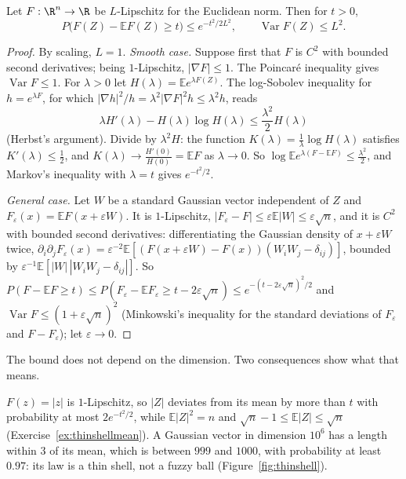 \begin{theorem}\label{thm:gaussconc}
Let $F:\R^n\to\R$ be $L$-Lipschitz for the Euclidean norm. Then for $t>0$,
\[
P\bigl(F(Z)-\mathbb EF(Z)\ge t\bigr)\le e^{-t^2/2L^2},\qquad\operatorname{Var}F(Z)\le L^2.
\]
\end{theorem}
\begin{proof}
By scaling, $L=1$. \emph{Smooth case.} Suppose first that $F$ is $C^2$ with bounded second derivatives; being $1$-Lipschitz, $|\nabla F|\le1$. The Poincar\'e inequality gives
$\operatorname{Var}F\le1$. For $\lambda>0$ let $H(\lambda)=\mathbb Ee^{\lambda F(Z)}$. The log-Sobolev inequality for $h=e^{\lambda F}$, for which $|\nabla h|^2/h=\lambda^2|\nabla F|^2h\le\lambda^2h$, reads
\[
\lambda H'(\lambda)-H(\lambda)\log H(\lambda)\le\frac{\lambda^2}2H(\lambda)
\]
(Herbst's argument). Divide by $\lambda^2H$: the function $K(\lambda)=\frac1\lambda\log H(\lambda)$ satisfies $K'(\lambda)\le\frac12$, and $K(\lambda)\to\frac{H'(0)}{H(0)}=\mathbb EF$ as $\lambda\to0$. So
$\log\mathbb Ee^{\lambda(F-\mathbb EF)}\le\frac{\lambda^2}2$, and Markov's inequality with $\lambda=t$ gives $e^{-t^2/2}$.

\emph{General case.} Let $W$ be a standard Gaussian vector independent of $Z$ and $F_\varepsilon(x)=\mathbb EF(x+\varepsilon W)$. It is $1$-Lipschitz, $|F_\varepsilon-F|\le\varepsilon\mathbb E|W|\le\varepsilon\sqrt n$, and it
is $C^2$ with bounded second derivatives: differentiating the Gaussian density of $x+\varepsilon W$ twice,
$\partial_i\partial_jF_\varepsilon(x)=\varepsilon^{-2}\mathbb E[(F(x+\varepsilon W)-F(x))(W_iW_j-\delta_{ij})]$, bounded by $\varepsilon^{-1}\mathbb E[|W|\,|W_iW_j-\delta_{ij}|]$. So
$P(F-\mathbb EF\ge t)\le P(F_\varepsilon-\mathbb EF_\varepsilon\ge t-2\varepsilon\sqrt n)\le e^{-(t-2\varepsilon\sqrt n)^2/2}$ and $\operatorname{Var}F\le(1+\varepsilon\sqrt n)^2$ (Minkowski's inequality for the standard deviations of $F_\varepsilon$ and $F-F_\varepsilon$); let $\varepsilon\to0$.
\end{proof}

The bound does not depend on the dimension. Two consequences show what that means.

\begin{example}\label{ex:thinshell}
$F(z)=|z|$ is $1$-Lipschitz, so $|Z|$ deviates from its mean by more than $t$ with probability at most $2e^{-t^2/2}$, while $\mathbb E|Z|^2=n$ and $\sqrt n-1\le\mathbb E|Z|\le\sqrt n$
(Exercise~\ref{ex:thinshellmean}). A Gaussian vector in dimension $10^6$ has a length within $3$ of its mean, which is between $999$ and $1000$, with probability at least $0.97$: its
law is a thin shell, not a fuzzy ball (Figure~\ref{fig:thinshell}).
\end{example}

